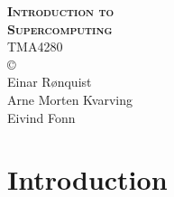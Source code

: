 \documentclass[onecolumn, twoside, a4paper, 11pt]{memoir}
\begin{document}
\begin{titlingpage}
  \centering
  {\Huge \bfseries \scshape
    Introduction to \\[0.2\baselineskip] Supercomputing} \\[2\baselineskip]
  {\Large TMA4280} \\[0.7\textheight]
  \copyright \\
  Einar R{\o}nquist \\
  Arne Morten Kvarving \\
  Eivind Fonn
\end{titlingpage}

\chapter{Introduction}

\end{document}
